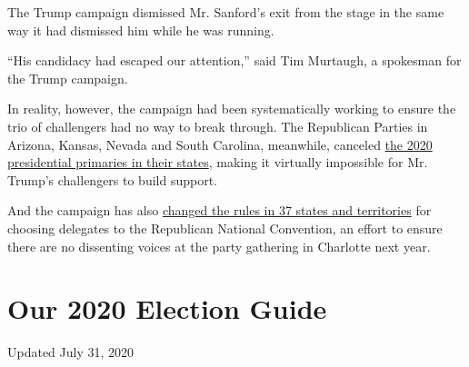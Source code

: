 The Trump campaign dismissed Mr. Sanford's exit from the stage in the
same way it had dismissed him while he was running.

``His candidacy had escaped our attention,'' said Tim Murtaugh, a
spokesman for the Trump campaign.

In reality, however, the campaign had been systematically working to
ensure the trio of challengers had no way to break through. The
Republican Parties in Arizona, Kansas, Nevada and South Carolina,
meanwhile, canceled
\href{https://www.nytimes.com/2019/09/06/us/politics/states-drop-republican-primaries.html?module=inline}{the
2020 presidential primaries in their states}, making it virtually
impossible for Mr. Trump's challengers to build support.

And the campaign has also
\href{https://www.nytimes.com/2019/10/02/us/politics/trump-republicans-delegates-convention.html}{changed
the rules in 37 states and territories} for choosing delegates to the
Republican National Convention, an effort to ensure there are no
dissenting voices at the party gathering in Charlotte next year.

\hypertarget{our-2020-election-guide}{%
\section{Our 2020 Election Guide}\label{our-2020-election-guide}}

Updated July 31, 2020

